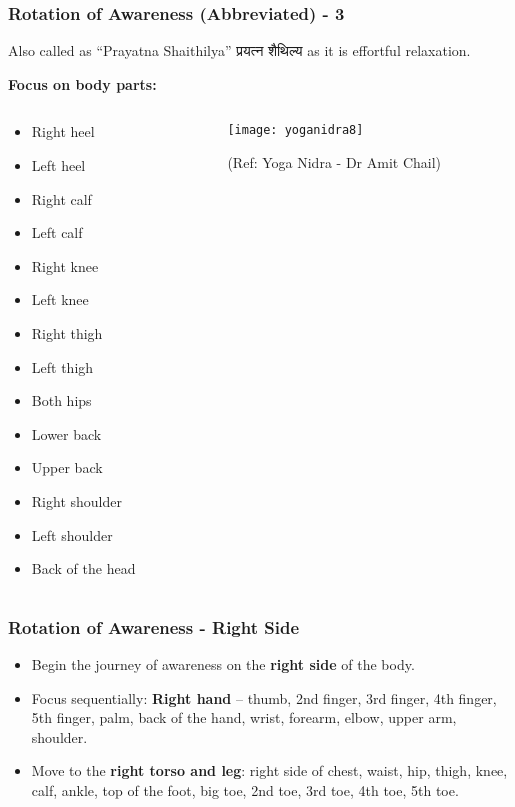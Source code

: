 \begin{frame}[fragile]\frametitle{Rotation of Awareness (Abbreviated) - 3}
Also called as ``Prayatna Shaithilya'' प्रयत्न शैथिल्य  as it is effortful relaxation.

\textbf{Focus on body parts:}

\begin{columns}
    \begin{column}[T]{0.3\linewidth}
    \begin{itemize}
        \item Right heel
        \item Left heel
        \item Right calf
        \item Left calf
        \item Right knee
        \item Left knee
        \item Right thigh
        \item Left thigh
        \item Both hips
        \item Lower back
        \item Upper back
        \item Right shoulder
        \item Left shoulder
        \item Back of the head
    \end{itemize}

    \end{column}
    \begin{column}[T]{0.7\linewidth}
	      \begin{center}
        \texttt{[image: yoganidra8]}

		{\tiny (Ref: Yoga Nidra - Dr Amit Chail)}		
        \end{center}
    \end{column}
  \end{columns}
	
\end{frame}

\begin{frame}[fragile]\frametitle{Rotation of Awareness - Right Side}
    \begin{itemize}
        \item Begin the journey of awareness on the \textbf{right side} of the body.
        \item Focus sequentially: \textbf{Right hand} -- thumb, 2nd finger, 3rd finger, 4th finger, 5th finger, palm, back of the hand, wrist, forearm, elbow, upper arm, shoulder.
        \item Move to the \textbf{right torso and leg}: right side of chest, waist, hip, thigh, knee, calf, ankle, top of the foot, big toe, 2nd toe, 3rd toe, 4th toe, 5th toe.
    \end{itemize}
\end{frame}

